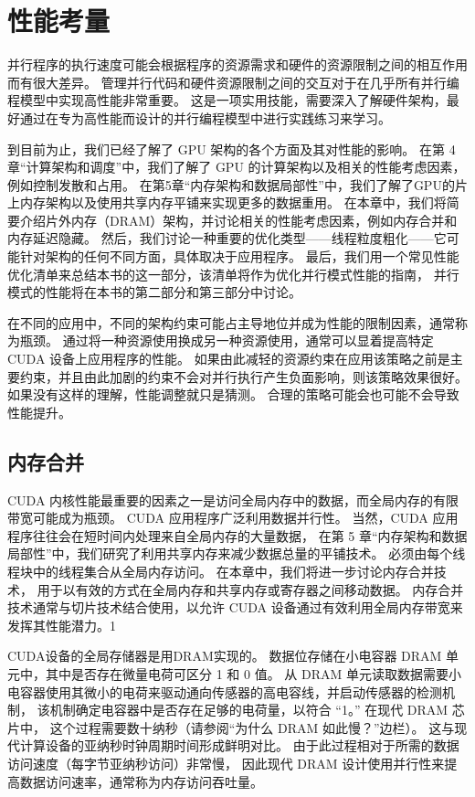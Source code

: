 \section{性能考量}
并行程序的执行速度可能会根据程序的资源需求和硬件的资源限制之间的相互作用而有很大差异。 
管理并行代码和硬件资源限制之间的交互对于在几乎所有并行编程模型中实现高性能非常重要。 
这是一项实用技能，需要深入了解硬件架构，最好通过在专为高性能而设计的并行编程模型中进行实践练习来学习。

到目前为止，我们已经了解了 GPU 架构的各个方面及其对性能的影响。 
在第 4 章“计算架构和调度”中，我们了解了 GPU 的计算架构以及相关的性能考虑因素，例如控制发散和占用。 
在第5章“内存架构和数据局部性”中，我们了解了GPU的片上内存架构以及使用共享内存平铺来实现更多的数据重用。 
在本章中，我们将简要介绍片外内存（DRAM）架构，并讨论相关的性能考虑因素，例如内存合并和内存延迟隐藏。 
然后，我们讨论一种重要的优化类型——线程粒度粗化——它可能针对架构的任何不同方面，具体取决于应用程序。 
最后，我们用一个常见性能优化清单来总结本书的这一部分，该清单将作为优化并行模式性能的指南，
并行模式的性能将在本书的第二部分和第三部分中讨论。

在不同的应用中，不同的架构约束可能占主导地位并成为性能的限制因素，通常称为瓶颈。 
通过将一种资源使用换成另一种资源使用，通常可以显着提高特定 CUDA 设备上应用程序的性能。 
如果由此减轻的资源约束在应用该策略之前是主要约束，并且由此加剧的约束不会对并行执行产生负面影响，则该策略效果很好。 
如果没有这样的理解，性能调整就只是猜测。 合理的策略可能会也可能不会导致性能提升。

\subsection{内存合并}
CUDA 内核性能最重要的因素之一是访问全局内存中的数据，而全局内存的有限带宽可能成为瓶颈。 
CUDA 应用程序广泛利用数据并行性。 当然，CUDA 应用程序往往会在短时间内处理来自全局内存的大量数据，
在第 5 章“内存架构和数据局部性”中，我们研究了利用共享内存来减少数据总量的平铺技术。 
必须由每个线程块中的线程集合从全局内存访问。 在本章中，我们将进一步讨论内存合并技术，
用于以有效的方式在全局内存和共享内存或寄存器之间移动数据。 
内存合并技术通常与切片技术结合使用，以允许 CUDA 设备通过有效利用全局内存带宽来发挥其性能潜力。1

CUDA设备的全局存储器是用DRAM实现的。 数据位存储在小电容器 DRAM 单元中，其中是否存在微量电荷可区分 1 和 0 值。 
从 DRAM 单元读取数据需要小电容器使用其微小的电荷来驱动通向传感器的高电容线，并启动传感器的检测机制，
该机制确定电容器中是否存在足够的电荷量，以符合 “1。” 在现代 DRAM 芯片中，
这个过程需要数十纳秒（请参阅“为什么 DRAM 如此慢？”边栏）。 这与现代计算设备的亚纳秒时钟周期时间形成鲜明对比。 
由于此过程相对于所需的数据访问速度（每字节亚纳秒访问）非常慢，
因此现代 DRAM 设计使用并行性来提高数据访问速率，通常称为内存访问吞吐量。

